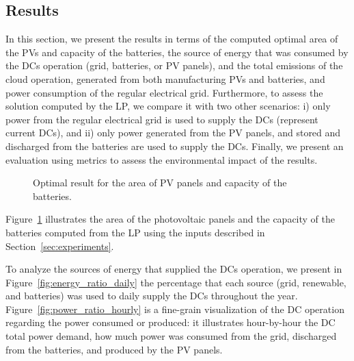 \subsection{Results}

In this section, we present the results in terms of the computed optimal area of the PVs and capacity of the batteries, the source of energy that was consumed by the DCs operation (grid, batteries, or PV panels), and the total emissions of the cloud operation, generated from both manufacturing PVs and batteries, and power consumption of the regular electrical grid. Furthermore, to assess the solution computed by the LP, we compare it with two other scenarios: i) only power from the regular electrical grid is used to supply the DCs (represent current DCs), and ii) only power generated from the PV panels, and stored and discharged from the batteries are used to supply the DCs. Finally, we present an evaluation using metrics to assess the environmental impact of the results.


\begin{figure}[!htbp]
  \centering
  {}
  \caption{Optimal result for the area of PV panels and capacity of the batteries.}
  \label{fig:sizing}
\end{figure}

Figure~\ref{fig:sizing} illustrates the area of the photovoltaic panels and the capacity of the batteries computed from the LP using the inputs described in Section~\ref{sec:experiments}. %

To analyze the sources of energy that supplied the DCs operation, we present in Figure~\ref{fig:energy_ratio_daily} the percentage that each source (grid, renewable, and batteries) was used to daily supply the DCs throughout the year. Figure~\ref{fig:power_ratio_hourly} is a fine-grain visualization of the DC operation regarding the power consumed or produced: it illustrates hour-by-hour the DC total power demand, how much power was consumed from the  grid, discharged from the batteries, and produced by the PV panels.


